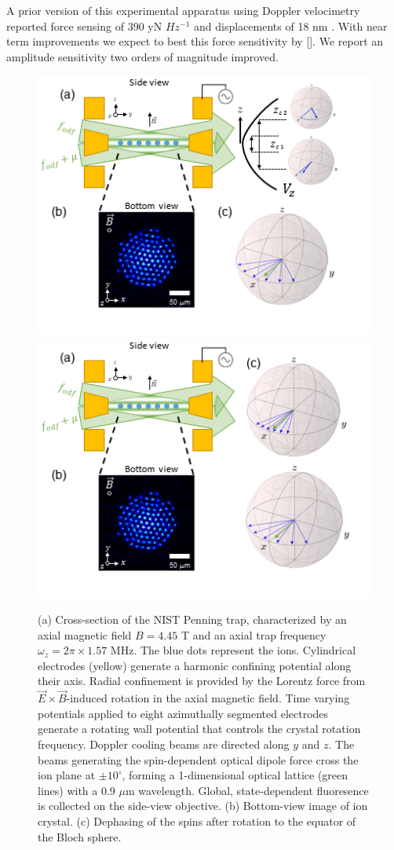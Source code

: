 \documentclass[aps,prl,twocolumn,superscriptaddress,floatfix]{revtex4-1}
\begin{document}
A prior version of this experimental apparatus using Doppler velocimetry reported force sensing of 390 yN $Hz^{-1}$ and displacements of 18 nm \citep{Biercuk2010a, Biercuk2011}. With near term improvements we expect to best this force sensitivity by []. We report an amplitude sensitivity two orders of magnitude improved.
\fi
\begin{figure}
    \centering
    \includegraphics[width=.5\textwidth]{expt3}
    \includegraphics[width=.5\textwidth]{expt4}
    \caption{(a) Cross-section of the NIST Penning trap, characterized by an axial magnetic field $B = 4.45$ T and an axial trap frequency $\omega_z = 2\pi \times 1.57$ MHz. The blue dots represent the ions. Cylindrical electrodes (yellow) generate a harmonic confining potential along their axis. Radial confinement is provided by the Lorentz force from $\vec{E} \times \vec{B}$-induced rotation in the axial magnetic field. Time varying potentials applied to eight azimuthally segmented electrodes generate a rotating wall potential that controls the crystal rotation frequency. Doppler cooling beams are directed along $y$ and $z$. The beams generating the spin-dependent optical dipole force cross the ion plane at $\pm 10^{\circ}$, forming a 1-dimensional optical lattice (green lines) with a 0.9 $\mu$m wavelength. Global, state-dependent fluoresence is collected on the side-view objective. (b) Bottom-view image of ion crystal. (c) Dephasing of the spins after rotation to the equator of the Bloch sphere. }
    \label{Expt}
\end{figure}
\end{document}
